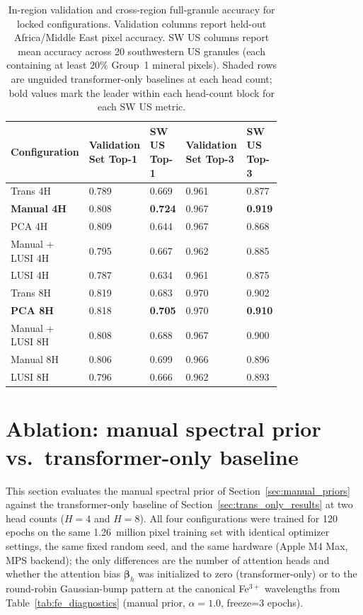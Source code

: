 \documentclass[preprint,12pt]{elsarticle}
\begin{document}
\begin{table}[!htbp]
\centering
\small
\caption{In-region validation and cross-region full-granule accuracy for locked configurations.
Validation columns report held-out Africa/Middle East pixel accuracy.
SW US columns report mean accuracy across 20 southwestern US granules (each containing at least $20\%$ Group~1 mineral pixels).
Shaded rows are unguided transformer-only baselines at each head count; bold values mark the leader within each head-count block for each SW US metric.}
\label{tab:crossscene}
\begin{tabular}{p{0.2\linewidth}p{0.13\linewidth}p{0.15\linewidth}p{0.13\linewidth}p{0.15\linewidth}}
\hline
\rowcolor[gray]{0.85}
\textbf{Configuration} & \textbf{Validation Set Top-1} & \textbf{SW US Top-1} & \textbf{Validation Set Top-3} & \textbf{SW US Top-3} \\
\hline
\rowcolor{pink!30}
Trans 4H & 0.789 & 0.669 & 0.961 & 0.877 \\
\hline
\textbf{Manual 4H} & 0.808 & \textbf{0.724} & 0.967 & \textbf{0.919} \\
\hline
PCA 4H & 0.809 & 0.644 & 0.967 & 0.868 \\
\hline
Manual + LUSI 4H & 0.795 & 0.667 & 0.962 & 0.885 \\
\hline
LUSI 4H & 0.787 & 0.634 & 0.961 & 0.875 \\
\hline
\rowcolor{pink!30}
Trans 8H & 0.819 & 0.683 & 0.970 & 0.902 \\
\hline
\textbf{PCA 8H} & 0.818 & \textbf{0.705} & 0.970 & \textbf{0.910} \\
\hline
Manual + LUSI 8H & 0.808 & 0.688 & 0.967 & 0.900 \\
\hline
Manual 8H & 0.806 & 0.699 & 0.966 & 0.896 \\
\hline
LUSI 8H & 0.796 & 0.666 & 0.962 & 0.893 \\
\hline
\end{tabular}
\end{table}

\section{Ablation: manual spectral prior vs.\ transformer-only baseline}
\label{sec:ablation}

This section evaluates the manual spectral prior of Section~\ref{sec:manual_priors} against the transformer-only baseline of Section~\ref{sec:trans_only_results} at two head counts ($H = 4$ and $H = 8$).
All four configurations were trained for 120 epochs on the same 1.26~million pixel training set with identical optimizer settings, the same fixed random seed, and the same hardware (Apple M4 Max, MPS backend); the only differences are the number of attention heads and whether the attention bias $\bm{\beta}_h$ was initialized to zero (transformer-only) or to the round-robin Gaussian-bump pattern at the canonical Fe$^{3+}$ wavelengths from Table~\ref{tab:fe_diagnostics} (manual prior, $\alpha = 1.0$, freeze=3 epochs).
\end{document}
